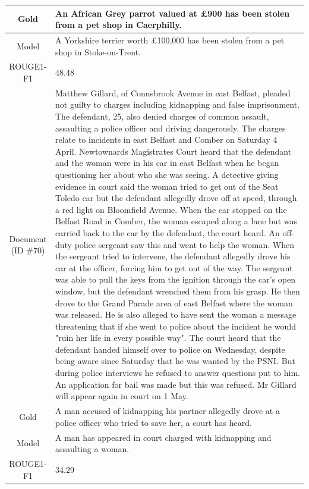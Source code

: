 \begin{table}[bth!]
\begin{tabular}{c|p{}}
\\ \hline
Gold & 
An African Grey parrot valued at £900 has been stolen from a pet shop in Caerphilly.
\\ \hline
Model & 
A Yorkshire terrier worth £100,000 has been stolen from a pet shop in Stoke-on-Trent.
\\ \hline
ROUGE1-F1 & 
48.48
\\ \hline
\makecell{Document\\(ID \#70)} & 
Matthew Gillard, of Connsbrook Avenue in east Belfast, pleaded not guilty to charges including kidnapping and false imprisonment. The defendant, 25, also denied charges of common assault, assaulting a police officer and driving dangerously. The charges relate to incidents in east Belfast and Comber on Saturday 4 April. Newtownards Magistrates Court heard that the defendant and the woman were in his car in east Belfast when he began questioning her about who she was seeing. A detective giving evidence in court said the woman tried to get out of the Seat Toledo car but the defendant allegedly drove off at speed, through a red light on Bloomfield Avenue. When the car stopped on the Belfast Road in Comber, the woman escaped along a lane but was carried back to the car by the defendant, the court heard. An off-duty police sergeant saw this and went to help the woman. When the sergeant tried to intervene, the defendant allegedly drove his car at the officer, forcing him to get out of the way. The sergeant was able to pull the keys from the ignition through the car's open window, but the defendant wrenched them from his grasp. He then drove to the Grand Parade area of east Belfast where the woman was released. He is also alleged to have sent the woman a message threatening that if she went to police about the incident he would "ruin her life in every possible way". The court heard that the defendant handed himself over to police on Wednesday, despite being aware since Saturday that he was wanted by the PSNI. But during police interviews he refused to answer questions put to him. An application for bail was made but this was refused. Mr Gillard will appear again in court on 1 May.
\\ \hline
Gold & 
A man accused of kidnapping his partner allegedly drove at a police officer who tried to save her, a court has heard.
\\ \hline
Model & 
A man has appeared in court charged with kidnapping and assaulting a woman.
\\ \hline
ROUGE1-F1 & 
34.29
\\ \hline

\end{tabular}
\end{table}
